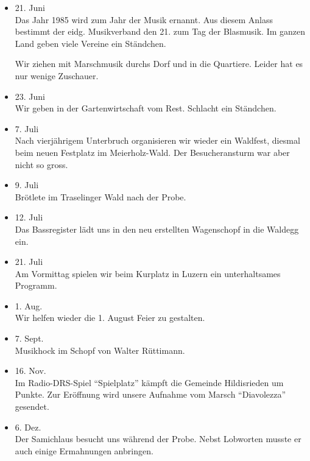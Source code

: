 \begin{history}
\begin{itemize}
        \item[]21. Juni\\
        Das Jahr 1985 wird zum Jahr der Musik ernannt. Aus diesem Anlass
        bestimmt der eidg. Musikverband den 21. zum Tag der Blasmusik. Im ganzen
        Land geben viele Vereine ein Ständchen.

        Wir ziehen mit Marschmusik durchs Dorf und in die Quartiere. Leider hat
        es nur wenige Zuschauer.

        \item[]23. Juni\\
        Wir geben in der Gartenwirtschaft vom Rest. Schlacht ein Ständchen.

        \item[]7. Juli\\
        Nach vierjährigem Unterbruch organisieren wir wieder ein Waldfest,
        diesmal beim neuen Festplatz im Meierholz-Wald. Der Besucheransturm war
        aber nicht so gross.

        \item[]9. Juli\\
        Brötlete im Traselinger Wald nach der Probe.

        \item[]12. Juli\\
        Das Bassregister lädt uns in den neu erstellten Wagenschopf in die
        Waldegg ein.

        \item[]21. Juli\\
        Am Vormittag spielen wir beim Kurplatz in Luzern ein unterhaltsames
        Programm.

        \item[]1. Aug.\\
        Wir helfen wieder die 1. August Feier zu gestalten.

        \item[]7. Sept.\\
        Musikhock im Schopf von Walter Rüttimann.

        \item[]16. Nov.\\
        Im Radio-DRS-Spiel \enquote{Spielplatz} kämpft die Gemeinde Hildisrieden
        um Punkte. Zur Eröffnung wird unsere Aufnahme vom Marsch
        \enquote{Diavolezza} gesendet.

        \item[]6. Dez.\\
        Der Samichlaus besucht uns während der Probe. Nebst Lobworten musste er
        auch einige Ermahnungen anbringen.

    \end{itemize}

\end{history}
